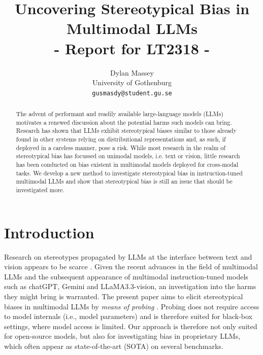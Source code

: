 \documentclass[11pt]{article}
\title{Uncovering Stereotypical Bias in Multimodal LLMs \\ - Report for LT2318 - }
\author{Dylan Massey \\
    University of Gothenburg \\
  \texttt{gusmasdy@student.gu.se}}
\begin{document}
\maketitle
\begin{abstract}


The advent of performant and readily available large-language models (LLMs) motivates a renewed discussion about the potential harms such models can bring. Research has shown that LLMs exhibit stereotypical biases similar to those already found in other systems relying on distributional representations and, as such, if deployed in a careless manner, pose a risk. While most research in the realm of stereotypical bias has focussed on unimodal models, i.e. text or vision, little research has been conducted on bias existent in multimodal models deployed for cross-modal tasks. We develop a new method to investigate stereotypical bias in instruction-tuned multimodal LLMs and show that stereotypical bias is still an issue that should be investigated more.

\end{abstract}

\section{Introduction}


Research on stereotypes propagated by LLMs at the interface between text and vision appears to be scarce \citep{rottger_msts_2025}. Given the recent advances in the field of multimodal LLMs \citep{ruggeri_multi-dimensional_2023} and the subsequent appearance of multimodal instruction-tuned models such as chatGPT, Gemini and LLaMA3.3-vision, an investigation into the harms they might bring is warranted. The present paper aims to elicit stereotypical biases in multimodal LLMs by \textit{means of probing} \citep{zhou_vlstereoset_2022}. Probing does not require access to model internals (i.e., model parameters) and is therefore suited for black-box settings, where model access is limited. Our approach is therefore not only suited for open-source models, but also for investigating bias in proprietary LLMs, which often appear as state-of-the-art (SOTA) on several benchmarks.
\end{document}
